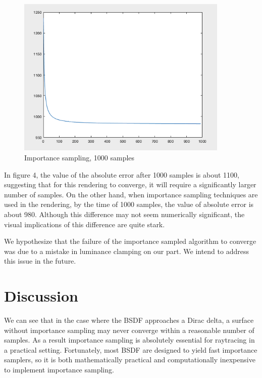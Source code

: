 \documentclass[12pt]{article}
\begin{document}
\begin{figure}[H]
  \centering
    \includegraphics[width=0.9\textwidth]{IS1000.png}
    \caption{Importance sampling, 1000 samples}
\end{figure}

In figure 4, the value of the absolute error after 1000 samples is about 1100, suggesting that for this rendering to converge, it will require a significantly larger number of samples. On the other hand, when importance sampling techniques are used in the rendering, by the time of 1000 samples, the value of absolute error is about 980. 
Although this difference may not seem numerically significant, the visual implications of this difference are quite stark.

We hypothesize that the failure of the importance sampled algorithm to converge was due to a mistake in luminance clamping on our part. 
We intend to address this issue in the future.

\section{Discussion}

We can see that in the case where the BSDF approaches a Dirac delta, a surface without importance sampling may never converge within a reasonable number of samples.
As a result importance sampling is absolutely essential for raytracing in a practical setting.
Fortunately, most BSDF are designed to yield fast importance samplers, so it is both mathematically practical and computationally inexpensive to implement importance sampling. 
\end{document}
